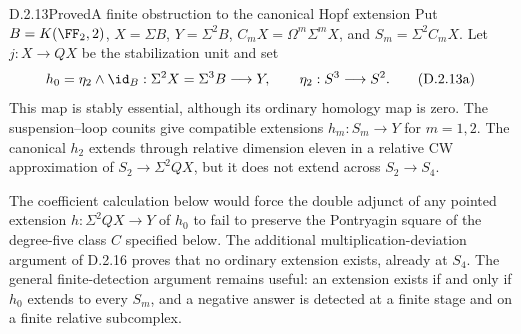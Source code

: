 \begin{claim}{D.2.13}{Proved}{A finite obstruction to the canonical Hopf extension}
Put $B=K(\FF_2,2)$, $X=\Sigma B$, $Y=\Sigma^2B$,
$C_mX=\Omega^m\Sigma^mX$, and $S_m=\Sigma^2C_mX$.
Let $j:X\to QX$ be the stabilization unit and set
\[
 h_0=\eta_2\wedge\id_B:\Sigma^2X=\Sigma^3B\longrightarrow Y,
 \qquad \eta_2:S^3\longrightarrow S^2.
 \tag{D.2.13a}
\]
This map is stably essential, although its ordinary homology map is zero.
The suspension--loop counits give compatible extensions $h_m:S_m\to Y$
for $m=1,2$. The canonical $h_2$ extends through relative dimension
eleven in a relative CW approximation of $S_2\to\Sigma^2QX$,
but it does not extend across $S_2\to S_4$.

The coefficient calculation below would force the double adjunct of
any pointed extension $h:\Sigma^2QX\to Y$ of $h_0$ to fail to
preserve the Pontryagin square of the degree-five class $C$ specified
below. The additional multiplication-deviation argument of D.2.16
proves that no ordinary extension exists, already at $S_4$.
The general finite-detection argument remains useful: an extension
exists if and only if $h_0$ extends to every $S_m$, and a negative
answer is detected at a finite stage and on a finite relative subcomplex.
\end{claim}
